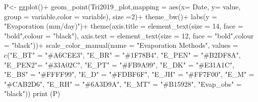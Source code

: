 \documentclass[
]{article}
\newenvironment{Shaded}{\begin{snugshade}}{\end{snugshade}}
\newcommand{\AttributeTok}[1]{\textcolor[rgb]{0.77,0.63,0.00}{#1}}
\newcommand{\DecValTok}[1]{\textcolor[rgb]{0.00,0.00,0.81}{#1}}
\newcommand{\FunctionTok}[1]{\textcolor[rgb]{0.00,0.00,0.00}{#1}}
\newcommand{\NormalTok}[1]{#1}
\newcommand{\OtherTok}[1]{\textcolor[rgb]{0.56,0.35,0.01}{#1}}
\newcommand{\SpecialCharTok}[1]{\textcolor[rgb]{0.00,0.00,0.00}{#1}}
\newcommand{\StringTok}[1]{\textcolor[rgb]{0.31,0.60,0.02}{#1}}
\begin{document}
\begin{Shaded}
\begin{Highlighting}[]
\NormalTok{P}\OtherTok{\textless{}{-}} \FunctionTok{ggplot}\NormalTok{()}\SpecialCharTok{+}
  \FunctionTok{geom\_point}\NormalTok{(Tri2019\_plot,}\AttributeTok{mapping =} \FunctionTok{aes}\NormalTok{(}\AttributeTok{x=}\NormalTok{ Date, }\AttributeTok{y=}\NormalTok{ value,  }\AttributeTok{group =}\NormalTok{ variable,}\AttributeTok{color =}\NormalTok{ variable), }\AttributeTok{size =}\DecValTok{2}\NormalTok{)}\SpecialCharTok{+}
  \FunctionTok{theme\_bw}\NormalTok{()}\SpecialCharTok{+}
  \FunctionTok{labs}\NormalTok{(}\AttributeTok{y =} \StringTok{"Evaporation (mm/day)"}\NormalTok{)}\SpecialCharTok{+}
  \FunctionTok{theme}\NormalTok{(}\AttributeTok{axis.title =} \FunctionTok{element\_text}\NormalTok{(}\AttributeTok{size =} \DecValTok{14}\NormalTok{, }\AttributeTok{face =} \StringTok{"bold"}\NormalTok{,}\AttributeTok{colour =} \StringTok{"black"}\NormalTok{),}
        \AttributeTok{axis.text  =} \FunctionTok{element\_text}\NormalTok{(}\AttributeTok{size =} \DecValTok{12}\NormalTok{, }\AttributeTok{face =} \StringTok{"bold"}\NormalTok{,}\AttributeTok{colour =} \StringTok{"black"}\NormalTok{))}\SpecialCharTok{+}
  \FunctionTok{scale\_color\_manual}\NormalTok{(}\AttributeTok{name =} \StringTok{"Evaporation Methods"}\NormalTok{,}
                     \AttributeTok{values =} \FunctionTok{c}\NormalTok{(}\StringTok{"E\_BT"} \OtherTok{=} \StringTok{"\#A6CEE3"}\NormalTok{,}
                                \StringTok{"E\_BR"} \OtherTok{=} \StringTok{"\#1F78B4"}\NormalTok{,}
                                \StringTok{"E\_PEN"} \OtherTok{=} \StringTok{"\#B2DF8A"}\NormalTok{,}
                                \StringTok{"E\_PEN2"}\OtherTok{=} \StringTok{"\#33A02C"}\NormalTok{,}
                                \StringTok{"E\_PT"} \OtherTok{=} \StringTok{"\#FB9A99"}\NormalTok{,}
                                \StringTok{"E\_DK"} \OtherTok{=} \StringTok{"\#E31A1C"}\NormalTok{,}
                                \StringTok{"E\_BS"} \OtherTok{=} \StringTok{"\#FFFF99"}\NormalTok{,}
                                 \StringTok{"E\_D"} \OtherTok{=} \StringTok{"\#FDBF6F"}\NormalTok{,                     }
                                \StringTok{"E\_JH"} \OtherTok{=} \StringTok{"\#FF7F00"}\NormalTok{,  }
                               \StringTok{"E\_M"} \OtherTok{=} \StringTok{"\#CAB2D6"}\NormalTok{,}
                               \StringTok{"E\_RH"} \OtherTok{=} \StringTok{"\#6A3D9A"}\NormalTok{,                     }
                                \StringTok{"E\_MT"} \OtherTok{=} \StringTok{"\#B15928"}\NormalTok{,}
                               \StringTok{"Evap\_obs"} \OtherTok{=} \StringTok{"black"}\NormalTok{))}
\FunctionTok{print}\NormalTok{ (P)}
\end{Highlighting}
\end{Shaded}
\end{document}
